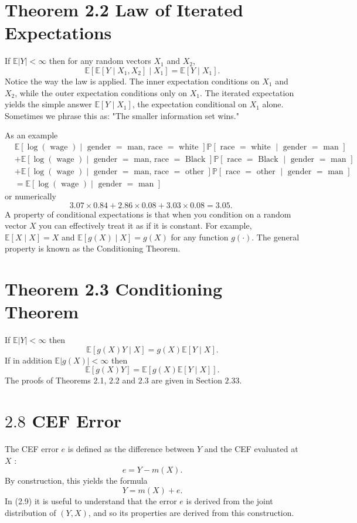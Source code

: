 \documentclass[10pt]{article}
\begin{document}
\section{Theorem 2.2 Law of Iterated Expectations}
If $\mathbb{E}|Y|<\infty$ then for any random vectors $X_{1}$ and $X_{2}$,
$$
\mathbb{E}\left[\mathbb{E}\left[Y \mid X_{1}, X_{2}\right] \mid X_{1}\right]=\mathbb{E}\left[Y \mid X_{1}\right] .
$$
Notice the way the law is applied. The inner expectation conditions on $X_{1}$ and $X_{2}$, while the outer expectation conditions only on $X_{1}$. The iterated expectation yields the simple answer $\mathbb{E}\left[Y \mid X_{1}\right]$, the expectation conditional on $X_{1}$ alone. Sometimes we phrase this as: "The smaller information set wins."

As an example
$$
\begin{aligned}
&\mathbb{E}[\log (\text { wage }) \mid \text { gender }=\text { man, race }=\text { white }] \mathbb{P}[\text { race }=\text { white } \mid \text { gender }=\text { man }] \\
&+\mathbb{E}[\log (\text { wage }) \mid \text { gender }=\text { man, race }=\text { Black }] \mathbb{P}[\text { race }=\text { Black } \mid \text { gender }=\text { man }] \\
&+\mathbb{E}[\log (\text { wage }) \mid \text { gender }=\text { man, race }=\text { other }] \mathbb{P}[\text { race }=\text { other } \mid \text { gender }=\text { man }] \\
&=\mathbb{E}[\log (\text { wage }) \mid \text { gender }=\text { man }]
\end{aligned}
$$
or numerically
$$
3.07 \times 0.84+2.86 \times 0.08+3.03 \times 0.08=3.05 \text {. }
$$
A property of conditional expectations is that when you condition on a random vector $X$ you can effectively treat it as if it is constant. For example, $\mathbb{E}[X \mid X]=X$ and $\mathbb{E}[g(X) \mid X]=g(X)$ for any function $g(\cdot)$. The general property is known as the Conditioning Theorem.

\section{Theorem 2.3 Conditioning Theorem}
If $\mathbb{E}|Y|<\infty$ then
$$
\mathbb{E}[g(X) Y \mid X]=g(X) \mathbb{E}[Y \mid X] .
$$
If in addition $\mathbb{E}|g(X)|<\infty$ then
$$
\mathbb{E}[g(X) Y]=\mathbb{E}[g(X) \mathbb{E}[Y \mid X]] .
$$
The proofs of Theorems 2.1, $2.2$ and $2.3$ are given in Section $2.33 .$

\section{$2.8$ CEF Error}
The CEF error $e$ is defined as the difference between $Y$ and the CEF evaluated at $X$ :
$$
e=Y-m(X) .
$$
By construction, this yields the formula
$$
Y=m(X)+e .
$$
In (2.9) it is useful to understand that the error $e$ is derived from the joint distribution of $(Y, X)$, and so its properties are derived from this construction.
\end{document}
